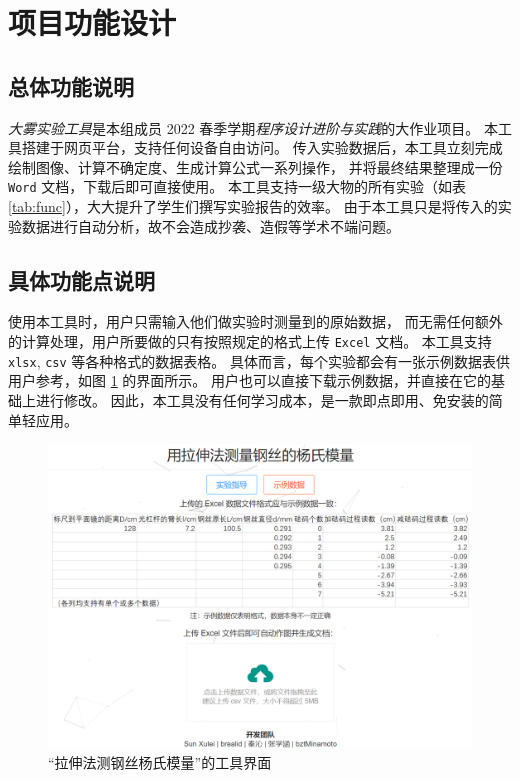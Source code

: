 \section{项目功能设计}

\subsection{总体功能说明}

\emph{大雾实验工具}是本组成员 2022 春季学期\textit{程序设计进阶与实践}的大作业项目。
本工具搭建于网页平台，支持任何设备自由访问。
传入实验数据后，本工具立刻完成绘制图像、计算不确定度、生成计算公式一系列操作，
并将最终结果整理成一份 \verb|Word| 文档，下载后即可直接使用。
本工具支持一级大物的所有实验（如表 \ref{tab:func}），大大提升了学生们撰写实验报告的效率。
由于本工具只是将传入的实验数据进行自动分析，故不会造成抄袭、造假等学术不端问题。

\subsection{具体功能点说明}

使用本工具时，用户只需输入他们做实验时测量到的原始数据，
而无需任何额外的计算处理，用户所要做的只有按照规定的格式上传 \verb|Excel| 文档。
本工具支持 \verb|xlsx|, \verb|csv| 等各种格式的数据表格。
具体而言，每个实验都会有一张示例数据表供用户参考，如图 \ref{fig:interface} 的界面所示。
用户也可以直接下载示例数据，并直接在它的基础上进行修改。
因此，本工具没有任何学习成本，是一款即点即用、免安装的简单轻应用。

\begin{figure}[htbp]
  \centering
  \includegraphics[width=\columnwidth]{figure/interface.png}
  \caption{“拉伸法测钢丝杨氏模量”的工具界面}
  \label{fig:interface}
\end{figure}

